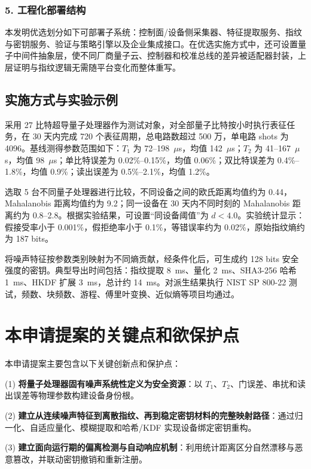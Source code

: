 \documentclass[12pt,a4paper]{article}
\begin{document}
\subsubsection{5. 工程化部署结构}
本发明优选划分如下可部署子系统：控制面/设备侧采集器、特征提取服务、指纹与密钥服务、验证与策略引擎以及企业集成接口。在优选实施方式中，还可设置量子中间件抽象层，使不同厂商量子云、控制器和校准总线的差异被适配器封装，上层证明与指纹逻辑无需随平台变化而整体重写。

\subsection{实施方式与实验示例}

采用 27 比特超导量子处理器作为测试对象，对全部量子比特按小时执行表征任务，在 30 天内完成 720 个表征周期，总电路数超过 500 万，单电路 shots 为 4096。基线测得参数范围如下：$T_1$ 为 72--198~$\mu$s，均值 142~$\mu$s；$T_2$ 为 41--167~$\mu$s，均值 98~$\mu$s；单比特误差为 0.02\%--0.15\%，均值 0.06\%；双比特误差为 0.4\%--1.8\%，均值 0.9\%；读出误差为 0.5\%--2.1\%，均值 1.2\%。

选取 5 台不同量子处理器进行比较，不同设备之间的欧氏距离均值约为 0.44，Mahalanobis 距离均值约为 9.2；同一设备在 30 天内不同时刻的 Mahalanobis 距离约为 0.8--2.8。根据实验结果，可设置“同设备阈值”为 $d < 4.0$。实验统计显示：假接受率小于 0.001\%，假拒绝率小于 0.1\%，等错误率约为 0.02\%，原始指纹熵约为 187 bits。

将噪声特征按参数类别映射为不同熵贡献，经条件化后，可生成约 128 bits 安全强度的密钥。典型导出时间包括：指纹提取 8~ms、量化 2~ms、SHA3-256 哈希 1~ms、HKDF 扩展 3~ms，总计约 14~ms。对派生结果执行 NIST SP 800-22 测试，频数、块频数、游程、傅里叶变换、近似熵等项目均通过。

\section{本申请提案的关键点和欲保护点}

本申请提案主要包含以下关键创新点和保护点：

(1) \textbf{将量子处理器固有噪声系统性定义为安全资源}：以 $T_1$、$T_2$、门误差、串扰和读出误差等物理参数构建设备身份根。

(2) \textbf{建立从连续噪声特征到离散指纹、再到稳定密钥材料的完整映射路径}：通过归一化、自适应量化、模糊提取和哈希/KDF 实现设备绑定密钥重构。

(3) \textbf{建立面向运行期的偏离检测与自动响应机制}：利用统计距离区分自然漂移与恶意篡改，并联动密钥撤销和重新注册。
\end{document}
